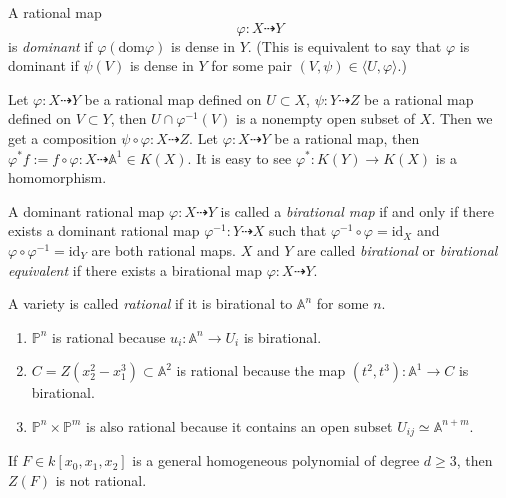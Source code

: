 \begin{definition}
	A rational map $$
		\varphi:X\dashrightarrow Y
	$$
	is \textit{dominant} if $ \varphi(\text{dom}\varphi) $ is dense in $ Y $. (This is equivalent to say that $ \varphi $ is dominant if $ \psi(V) $ is dense in $ Y $ for some pair $ (V,\psi)\in\langle U,\varphi\rangle $.)
\end{definition}
\begin{remark}
	Let $ \varphi:X\dashrightarrow Y $  be a rational map defined on $ U\subset X $, $ \psi:Y\dashrightarrow Z $ be a rational map defined on $ V\subset Y $, then $ U\cap \varphi^{-1}(V) $ is a nonempty open subset of $ X $. Then we get a composition $ \psi\circ\varphi:X\dashrightarrow Z $. Let $ \varphi:X\dashrightarrow Y $ be a rational map, then $ \varphi^\ast f:=f\circ\varphi :X\dashrightarrow \mathbb{A}^1\in K(X)$. It is easy to see $ \varphi^\ast:K(Y)\to K(X) $ is a homomorphism.
\end{remark}
\begin{definition}
	A dominant rational map $ \varphi:X\dashrightarrow Y $ is called a \textit{birational map} if and only if there exists a dominant rational map $ \varphi^{-1}:Y\dashrightarrow X $ such that $ \varphi^{-1}\circ \varphi=\text{id}_X $ and $ \varphi\circ\varphi^{-1}=\text{id}_Y $ are both rational maps. $ X $ and $ Y $ are called \textit{birational} or \textit{birational equivalent} if there exists a birational map $ \varphi:X\dashrightarrow Y $.
\end{definition}
\begin{definition}
	A variety is called \textit{rational} if it is birational to $ \mathbb{A}^n $ for some $ n $.
\end{definition}
\begin{example}
	\noindent\begin{enumerate}
		\item $ \mathbb{P}^n $ is rational because $ u_i:\mathbb{A}^n\to U_i $ is birational.
		\item $ C=Z(x_2^2-x_1^3)\subset \mathbb{A}^2 $ is rational because the map $ (t^2,t^3): \mathbb{A}^1\to C $ is birational.
		\item $ \mathbb{P}^n\times\mathbb{P}^m $ is also rational because it contains an open subset $ U_{ij}\simeq \mathbb{A}^{n+m} $.
	\end{enumerate}
\end{example}
\begin{remark}
	If $ F\in k [x_0,x_1,x_2] $ is a general homogeneous polynomial of degree $ d\geq 3 $, then $ Z(F) $ is not rational.
\end{remark}

